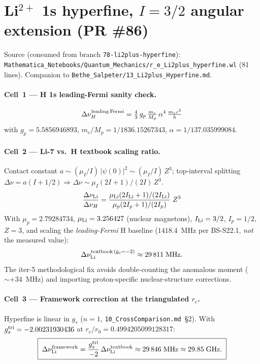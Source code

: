 \section{Li$^{2+}$ 1s hyperfine, $I=3/2$ angular extension (PR \#86)}
\label{sec:eq-li2plus-hyperfine}

Source (consumed from branch \texttt{78-li2plus-hyperfine}):
\texttt{Mathematica\_Notebooks/Quantum\_Mechanics/r\_e\_Li2plus\_hyperfine.wl}
(81 lines).
Companion to
\texttt{Bethe\_Salpeter/13\_Li2plus\_Hyperfine.md}.

\paragraph{Cell~1 --- H 1s leading-Fermi sanity check.}
\[
\Delta\nu_H^{\rm leading\,Fermi}
  = \tfrac{4}{3}\,g_p \,\tfrac{m_e}{M_p}\,\alpha^4\,
    \tfrac{m_e c^2}{h}
\]
with $g_p = 5.5856946893$, $m_e/M_p = 1/1836.15267343$,
$\alpha = 1/137.035999084$. 

\paragraph{Cell~2 --- Li-7 vs.~H textbook scaling ratio.}
Contact constant $a \sim (\mu_I/I)\,|\psi(0)|^2 \sim (\mu_I/I)\,Z^3$;
top-interval splitting $\Delta\nu = a(I + 1/2) \Rightarrow \Delta\nu \sim
\mu_I (2I+1)/(2I)\,Z^3$.
\[
\frac{\Delta\nu_{\rm Li}}{\Delta\nu_H}
  = \frac{\mu_{\rm Li}(2 I_{\rm Li}+1)/(2 I_{\rm Li})}
         {\mu_p (2 I_p+1)/(2 I_p)}\;Z^3
\]
With $\mu_p = 2.79284734$, $\mu_{\rm Li} = 3.256427$ (nuclear magnetons),
$I_{\rm Li} = 3/2$, $I_p = 1/2$, $Z = 3$, and scaling the \emph{leading-Fermi}
H baseline ($1418.4$~MHz per BS-S22.1, \emph{not} the measured value):
\[
\Delta\nu_{\rm Li}^{\rm textbook\,(g_s=-2)} \approx 29\,811\;\text{MHz.}
\]
\wolframcheck{} The iter-5 methodological fix avoids double-counting the
anomalous moment ($\sim +34$~MHz) and importing proton-specific
nuclear-structure corrections.

\paragraph{Cell~3 --- Framework correction at the triangulated $r_e$.}
Hyperfine is linear in $g_s$ ($n=1$,
\texttt{10\_CrossComparison.md}~\S2). With
$g_s^{\rm tri} = -2.00231930436$ at $r_e/r_0 = 0.4994205099128317$:
\[
\boxed{\;
  \Delta\nu_{\rm Li}^{\rm framework}
    = \frac{g_s^{\rm tri}}{-2}\,\Delta\nu_{\rm Li}^{\rm textbook}
    \approx 29\,846\;\text{MHz} \approx 29.85\;\text{GHz.}
\;}
\]

